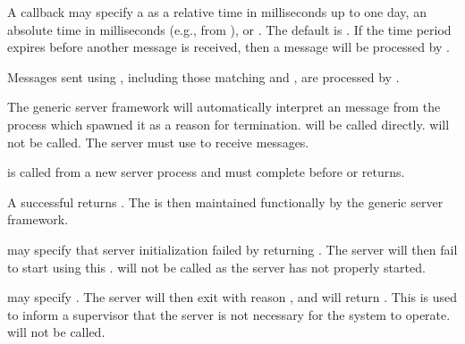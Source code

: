 A callback may specify a  as a relative time in
milliseconds up to one day, an absolute time in milliseconds (e.g.,
from ), or . The default
 is . If the time period expires before
another message is received, then a  message will be
processed by .

Messages sent using , including those matching
and ,
are processed by .

The generic server framework will automatically interpret an
 message from the process which spawned it as a reason
for termination.  will be called
directly.  will not be called. The server must use
 to receive  messages.

\begin{procedure}
\end{procedure}
\returns{}

\begin{argtbl}
\end{argtbl}

 is called from a new server process and
must complete before  or
 returns.

A successful  returns . The  is then maintained
functionally by the generic server framework.

 may specify that server initialization failed by
returning . The server will then fail to
start using this .  will not be called
as the server has not properly started.

 may specify . The server will then exit
with reason , and  will
return . This is used to inform a
supervisor that the server is not necessary
for the system to operate.  will not be called.


